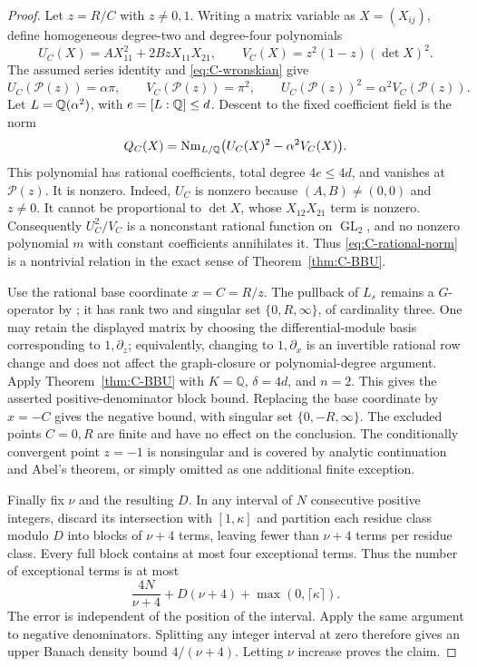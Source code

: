 \begin{proof}
Let $z=R/C$ with $z\neq0,1$.  Writing a matrix variable as
$X=(X_{ij})$, define homogeneous degree-two and degree-four
polynomials
\[
 U_C(X)=A X_{11}^2+2BzX_{11}X_{21},\qquad
 V_C(X)=z^2(1-z)(\det X)^2.
\]
The assumed series identity and \eqref{eq:C-wronskian} give
\begin{equation}\label{eq:C-norm-relation}
 U_C(\mathcal P(z))=\alpha\pi,
 \qquad V_C(\mathcal P(z))=\pi^2,
 \qquad U_C(\mathcal P(z))^2=\alpha^2 V_C(\mathcal P(z)).
\end{equation}
Let $L=\mathbb Q(\alpha^2)$, with $e=[L:\mathbb Q]\le d$. Descent to the fixed
coefficient field is the norm
\begin{equation}\label{eq:C-rational-norm}
 Q_C(X)=\operatorname{Nm}_{L/\mathbb Q}\bigl(U_C(X)^2-\alpha^2V_C(X)\bigr).
\end{equation}
This polynomial
has rational coefficients, total degree $4e\leq4d$, and vanishes
at $\mathcal P(z)$.  It is nonzero.  Indeed, $U_C$ is nonzero
because $(A,B)\neq(0,0)$ and $z\neq0$.  It cannot be proportional
to $\det X$, whose $X_{12}X_{21}$ term is nonzero.  Consequently
$U_C^2/V_C$ is a nonconstant rational function on
$\operatorname{GL}_2$, and no nonzero polynomial $m$ with
constant coefficients annihilates it.  Thus
\eqref{eq:C-rational-norm} is a nontrivial relation in the exact
sense of Theorem~\ref{thm:C-BBU}.

Use the rational base coordinate $x=C=R/z$.  The pullback of
$L_s$ remains a $G$-operator by
\cite[Theorem~3.5(4)]{BaldiBinyaminiUrbanik2026}; it has rank two
and singular set $\{0,R,\infty\}$, of cardinality three.  One may
retain the displayed matrix by choosing the differential-module
basis corresponding to $1,\partial_z$; equivalently, changing to
$1,\partial_x$ is an invertible rational row change and does not
affect the graph-closure or polynomial-degree argument.  Apply
Theorem~\ref{thm:C-BBU} with $K=\mathbb Q$, $\delta=4d$, and
$n=2$.  This gives the asserted positive-denominator block bound.
Replacing the base coordinate by $x=-C$ gives the negative bound,
with singular set $\{0,-R,\infty\}$.  The excluded points
$C=0,R$ are finite and have no effect on the conclusion.  The
conditionally convergent point $z=-1$ is nonsingular and is covered
by analytic continuation and Abel's theorem, or simply omitted as
one additional finite exception.

Finally fix $\nu$ and the resulting $D$.  In any interval of $N$
consecutive positive integers, discard its intersection with
$[1,\kappa]$ and partition each residue class modulo $D$ into
blocks of $\nu+4$ terms, leaving fewer than $\nu+4$ terms per
residue class.  Every full block contains at most four exceptional
terms.  Thus the number of exceptional terms is at most
\[
 \frac{4N}{\nu+4}+D(\nu+4)+\max(0,\lceil\kappa\rceil).
\]
The error is independent of the position of the interval.  Apply
the same argument to negative denominators.  Splitting any integer
interval at zero therefore gives an upper Banach density bound
$4/(\nu+4)$.  Letting $\nu$ increase proves the claim.
\end{proof}

